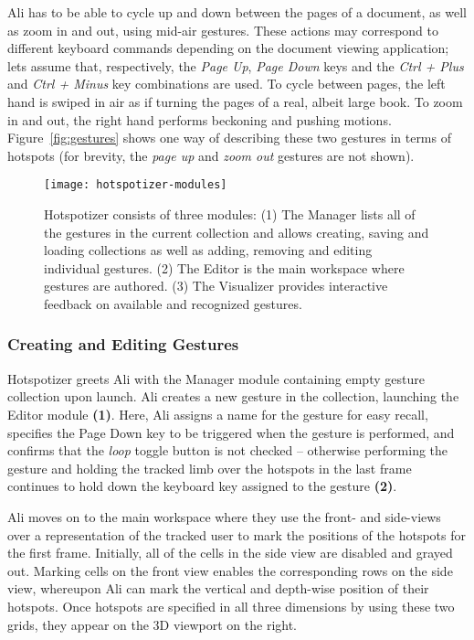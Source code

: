 Ali has to be able to cycle up and down between the pages of a document, as well as zoom in and out, using mid-air gestures. These actions may correspond to different keyboard commands depending on the document viewing application; lets assume that, respectively, the \emph{Page Up}, \emph{Page Down} keys and the \emph{Ctrl + Plus} and \emph{Ctrl + Minus} key combinations are used. To cycle between pages, the left hand is swiped in air as if turning the pages of a real, albeit large book. To zoom in and out, the right hand performs beckoning and pushing motions. Figure~\ref{fig:gestures} shows one way of describing these two gestures in terms of hotspots (for brevity, the \emph{page up} and \emph{zoom out} gestures are not shown).

\begin{figure}[t]
\centering
\texttt{[image: hotspotizer-modules]}
\caption{Hotspotizer consists of three modules: (1) The Manager lists all of the gestures in the current collection and allows creating, saving and loading collections as well as adding, removing and editing individual gestures. (2) The Editor is the main workspace where gestures are authored. (3) The Visualizer provides interactive feedback on available and recognized gestures.}
\label{fig:hotspotizer-modules}
\end{figure}

\subsubsection{Creating and Editing Gestures}

Hotspotizer greets Ali with the Manager module containing empty gesture collection upon launch. Ali creates a new gesture in the collection, launching the Editor module \textbf{(1)}. Here, Ali assigns a name for the gesture for easy recall, specifies the Page Down key to be triggered when the gesture is performed, and confirms that the \emph{loop} toggle button is not checked – otherwise performing the gesture and holding the tracked limb over the hotspots in the last frame continues to hold down the keyboard key assigned to the gesture \textbf{(2)}.

Ali moves on to the main workspace where they use the front- and side-views over a representation of the tracked user to mark the positions of the hotspots for the first frame. Initially, all of the cells in the side view are disabled and grayed out. Marking cells on the front view enables the corresponding rows on the side view, whereupon Ali can mark the vertical and depth-wise position of their hotspots. Once hotspots are specified in all three dimensions by using these two grids, they appear on the 3D viewport on the right.

